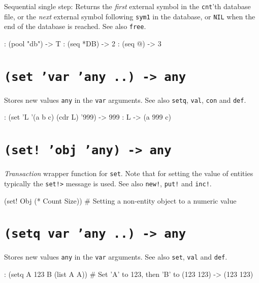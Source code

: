 Sequential single step: Returns the \emph{first} external symbol in the
\texttt{cnt}'th database file, or the \emph{next} external symbol following \texttt{sym1}
in the database, or \texttt{NIL} when the end of the database is reached. See
also \texttt{free}.


\begin{wideverbatim}
: (pool "db")
-> T
: (seq *DB)
-> {2}
: (seq @)
-> {3}
\end{wideverbatim}

 
\section*{\texttt{(set 'var 'any ..) -> any}}
\label{sec:func-ref-S-(set 'var 'any ..) -> any}


Stores new values \texttt{any} in the \texttt{var} arguments. See also \texttt{setq}, \texttt{val},
\texttt{con} and \texttt{def}.


\begin{wideverbatim}
: (set 'L '(a b c)  (cdr L) '999)
-> 999
: L
-> (a 999 c)
\end{wideverbatim}

 
\section*{\texttt{(set! 'obj 'any) -> any}}
\label{sec:func-ref-S-(set! 'obj 'any) -> any}


\emph{Transaction} wrapper function for \texttt{set}. Note that
for setting the value of entities typically the \texttt{set!>} message is used.
See also \texttt{new!}, \texttt{put!} and \texttt{inc!}.


\begin{wideverbatim}
(set! Obj (* Count Size))  # Setting a non-entity object to a numeric value
\end{wideverbatim}

 
\section*{\texttt{(setq var 'any ..) -> any}}
\label{sec:func-ref-S-(setq var 'any ..) -> any}


Stores new values \texttt{any} in the \texttt{var} arguments. See also \texttt{set}, \texttt{val}
and \texttt{def}.


\begin{wideverbatim}
: (setq  A 123  B (list A A))  # Set 'A' to 123, then 'B' to (123 123)
-> (123 123)
\end{wideverbatim}

